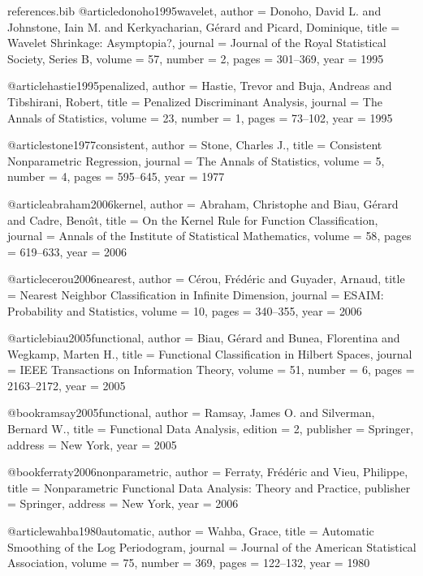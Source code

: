 \begin{filecontents*}[overwrite]{references.bib}
@article{donoho1995wavelet,
  author  = {Donoho, David L. and Johnstone, Iain M. and Kerkyacharian, G{\'e}rard and Picard, Dominique},
  title   = {Wavelet Shrinkage: Asymptopia?},
  journal = {Journal of the Royal Statistical Society, Series B},
  volume  = {57},
  number  = {2},
  pages   = {301--369},
  year    = {1995}
}

@article{hastie1995penalized,
  author  = {Hastie, Trevor and Buja, Andreas and Tibshirani, Robert},
  title   = {Penalized Discriminant Analysis},
  journal = {The Annals of Statistics},
  volume  = {23},
  number  = {1},
  pages   = {73--102},
  year    = {1995}
}

@article{stone1977consistent,
  author  = {Stone, Charles J.},
  title   = {Consistent Nonparametric Regression},
  journal = {The Annals of Statistics},
  volume  = {5},
  number  = {4},
  pages   = {595--645},
  year    = {1977}
}

@article{abraham2006kernel,
  author  = {Abraham, Christophe and Biau, G{\'e}rard and Cadre, Beno{\^\i}t},
  title   = {On the Kernel Rule for Function Classification},
  journal = {Annals of the Institute of Statistical Mathematics},
  volume  = {58},
  pages   = {619--633},
  year    = {2006}
}

@article{cerou2006nearest,
  author  = {C{\'e}rou, Fr{\'e}d{\'e}ric and Guyader, Arnaud},
  title   = {Nearest Neighbor Classification in Infinite Dimension},
  journal = {ESAIM: Probability and Statistics},
  volume  = {10},
  pages   = {340--355},
  year    = {2006}
}

@article{biau2005functional,
  author  = {Biau, G{\'e}rard and Bunea, Florentina and Wegkamp, Marten H.},
  title   = {Functional Classification in {H}ilbert Spaces},
  journal = {IEEE Transactions on Information Theory},
  volume  = {51},
  number  = {6},
  pages   = {2163--2172},
  year    = {2005}
}

@book{ramsay2005functional,
  author    = {Ramsay, James O. and Silverman, Bernard W.},
  title     = {Functional Data Analysis},
  edition   = {2},
  publisher = {Springer},
  address   = {New York},
  year      = {2005}
}

@book{ferraty2006nonparametric,
  author    = {Ferraty, Fr{\'e}d{\'e}ric and Vieu, Philippe},
  title     = {Nonparametric Functional Data Analysis: Theory and Practice},
  publisher = {Springer},
  address   = {New York},
  year      = {2006}
}

@article{wahba1980automatic,
  author  = {Wahba, Grace},
  title   = {Automatic Smoothing of the Log Periodogram},
  journal = {Journal of the American Statistical Association},
  volume  = {75},
  number  = {369},
  pages   = {122--132},
  year    = {1980}
}


\end{filecontents*}

